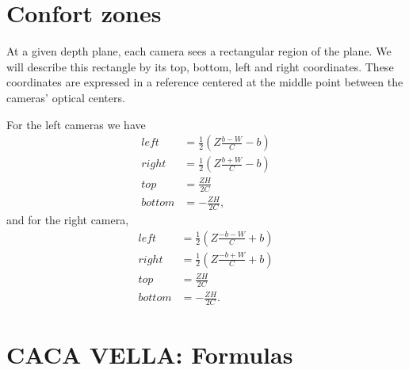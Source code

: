 \documentclass[12pt,a4paper]{article}
\begin{document}
\section{Confort zones}
At a given depth plane, each camera sees a rectangular region of the plane.  We will describe this rectangle by its top, bottom, left and right coordinates. These coordinates are expressed in a reference centered at the middle point between the cameras' optical centers.

For the left cameras we have
\begin{equation}
 \begin{split}
  left &= \frac{1}{2} \left( Z \frac{b - W}{C} - b\right) \\
  right &= \frac{1}{2} \left( Z \frac{b + W}{C} - b\right) \\
  top &= \frac{Z H}{2 C} \\
  bottom &= -\frac{Z H}{2 C} ,
 \end{split}
\end{equation}
and for the right camera,
\begin{equation}
 \begin{split}
  left &= \frac{1}{2} \left( Z \frac{-b - W}{C} + b\right) \\
  right &= \frac{1}{2} \left( Z \frac{-b + W}{C} + b\right) \\
  top &= \frac{Z H}{2 C} \\
  bottom &= -\frac{Z H}{2 C} .
 \end{split}
\end{equation}



\section{CACA VELLA: Formulas}
\end{document}
